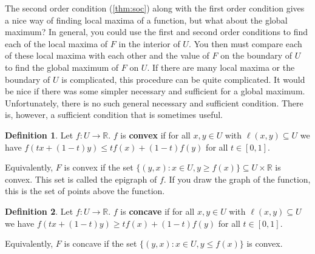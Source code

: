 \documentclass[12pt,reqno]{amsart}
\theoremstyle{definition}
\newtheorem{definition}{Definition}[section]
\def\R{\mathbb{R}}
\renewcommand{\to}{{\rightarrow}}
\begin{document}
The second order condition (\ref{thm:soc}) along with the first order
condition gives a nice way of finding local maxima of a function, but
what about the global maximum?  In general, you could use the first and
second order conditions to find each of the local maxima of $F$ in the
interior of $U$. You then must compare each of these local maxima with
each other and the value of $F$ on the boundary of $U$ to find the
global maximum of $F$ on $U$. If there are many local maxima or the
boundary of $U$ is complicated, this procedure can be quite
complicated. 
It would be nice if there was some simpler necessary and
sufficient for a global maximum. Unfortunately, there is no such
general necessary and sufficient condition. There is, however, a
sufficient condition that is sometimes useful.
\begin{definition}
  Let $f:U \to \R$. $f$ is \textbf{convex} if for all $x,y \in U$ with
  $\ell(x,y) \subseteq U$ we have $f(tx + (1-t)y) \leq tf(x) + (1-t)
  f(y)$ for all $t \in [0,1]$.
\end{definition}
Equivalently, $F$ is convex if the set $\{(y,x): x \in U, y \geq
f(x)\} \subseteq U \times \R$ is convex. This set is called the
epigraph of $f$. If you draw the graph of the function, this is the
set of points above the function.
\begin{definition}
  Let $f:U \to \R$. $f$ is \textbf{concave} if for all $x,y \in U$ with
  $\ell(x,y) \subseteq U$ we have $f(tx + (1-t)y) \geq tf(x) + (1-t)
  f(y)$ for all $t \in [0,1]$.
\end{definition}
Equivalently, $F$ is concave if the set $\{(y,x): x \in U, y \leq
f(x)\}$ is convex.
\end{document}
